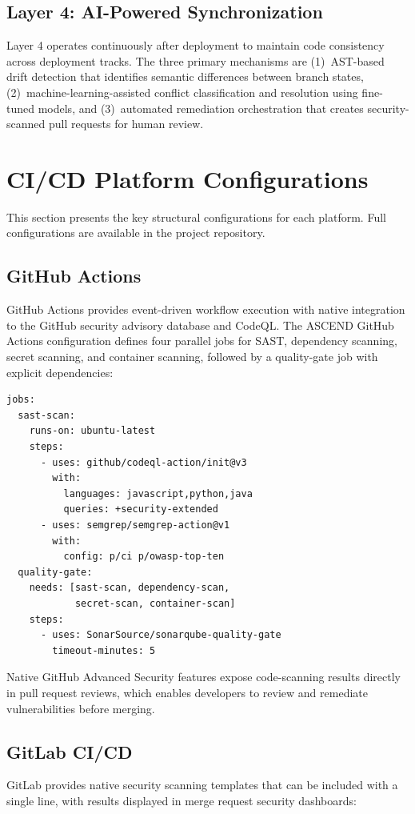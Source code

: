 \documentclass{ieeeaccess}
\begin{document}
\subsection{Layer 4: AI-Powered Synchronization}
Layer 4 operates continuously after deployment to maintain code consistency across deployment tracks. The three primary mechanisms are (1)~AST-based drift detection that identifies semantic differences between branch states, (2)~machine-learning-assisted conflict classification and resolution using fine-tuned models, and (3)~automated remediation orchestration that creates security-scanned pull requests for human review.

\section{CI/CD Platform Configurations}
\label{sec:platforms}
This section presents the key structural configurations for each platform. Full configurations are available in the project repository.

\subsection{GitHub Actions}
GitHub Actions provides event-driven workflow execution with native integration to the GitHub security advisory database and CodeQL. The ASCEND GitHub Actions configuration defines four parallel jobs for SAST, dependency scanning, secret scanning, and container scanning, followed by a quality-gate job with explicit dependencies:

\begin{small}
\begin{verbatim}
jobs:
  sast-scan:
    runs-on: ubuntu-latest
    steps:
      - uses: github/codeql-action/init@v3
        with:
          languages: javascript,python,java
          queries: +security-extended
      - uses: semgrep/semgrep-action@v1
        with:
          config: p/ci p/owasp-top-ten
  quality-gate:
    needs: [sast-scan, dependency-scan,
            secret-scan, container-scan]
    steps:
      - uses: SonarSource/sonarqube-quality-gate
        timeout-minutes: 5
\end{verbatim}
\end{small}

Native GitHub Advanced Security features expose code-scanning results directly in pull request reviews, which enables developers to review and remediate vulnerabilities before merging.

\subsection{GitLab CI/CD}
GitLab provides native security scanning templates that can be included with a single line, with results displayed in merge request security dashboards:
\end{document}
